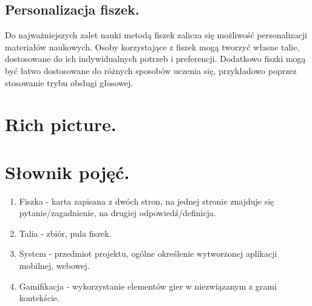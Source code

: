 \subsection{Personalizacja fiszek.}
Do najważniejszych zalet nauki metodą fiszek zalicza się możliwość personalizacji materiałów naukowych. Osoby korzystające z fiszek mogą tworzyć własne talie, dostosowane do ich indywidualnych potrzeb i preferencji. Dodatkowo fiszki mogą być łatwo dostosowane do różnych sposobów uczenia się, przykładowo poprzez stosowanie trybu obsługi głosowej.

\section{Rich picture.}
\section{Słownik pojęć.}

\begin{enumerate}
    \item Fiszka - karta zapisana z dwóch stron, na jednej stronie znajduje się pytanie/zagadnienie, na drugiej odpowiedź/definicja.
    \item Talia - zbiór, pula fiszek.
    \item System - przedmiot projektu, ogólne określenie wytworzonej aplikacji mobilnej, webowej.
    \item Gamifikacja - wykorzystanie elementów gier w niezwiązanym z grami kontekście.
    \end{enumerate}

\printbibliography
